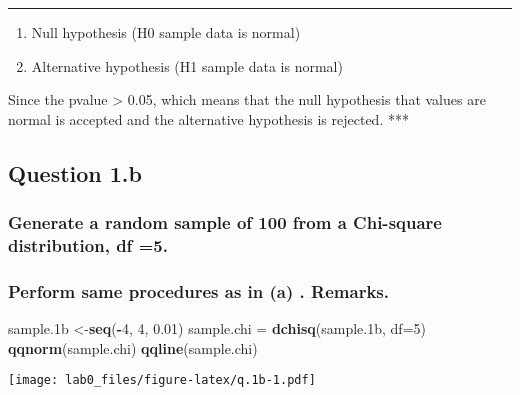 \documentclass[
]{article}
\newenvironment{Shaded}{\begin{snugshade}}{\end{snugshade}}
\newcommand{\DataTypeTok}[1]{\textcolor[rgb]{0.13,0.29,0.53}{#1}}
\newcommand{\DecValTok}[1]{\textcolor[rgb]{0.00,0.00,0.81}{#1}}
\newcommand{\FloatTok}[1]{\textcolor[rgb]{0.00,0.00,0.81}{#1}}
\newcommand{\KeywordTok}[1]{\textcolor[rgb]{0.13,0.29,0.53}{\textbf{#1}}}
\newcommand{\NormalTok}[1]{#1}
\newcommand{\OperatorTok}[1]{\textcolor[rgb]{0.81,0.36,0.00}{\textbf{#1}}}
\newcommand{\StringTok}[1]{\textcolor[rgb]{0.31,0.60,0.02}{#1}}
\providecommand{\tightlist}{%
  \setlength{\itemsep}{0pt}\setlength{\parskip}{0pt}}
\begin{document}
\begin{center}\rule{0.5\linewidth}{0.5pt}\end{center}

\begin{enumerate}
\def\labelenumi{\arabic{enumi}.}
\tightlist
\item
  Null hypothesis (H0 sample data is normal)
\item
  Alternative hypothesis (H1 sample data is normal)
\end{enumerate}

Since the pvalue \textgreater{} 0.05, which means that the null
hypothesis that values are normal is accepted and the alternative
hypothesis is rejected. ***

\hypertarget{question-1.b}{%
\subsection{Question 1.b}\label{question-1.b}}

\hypertarget{generate-a-random-sample-of-100-from-a-chi-square-distribution-df-5.}{%
\subsubsection{Generate a random sample of 100 from a Chi-square
distribution, df
=5.}\label{generate-a-random-sample-of-100-from-a-chi-square-distribution-df-5.}}

\hypertarget{perform-same-procedures-as-in-a-.-remarks.}{%
\subsubsection{Perform same procedures as in (a) .
Remarks.}\label{perform-same-procedures-as-in-a-.-remarks.}}

\begin{Shaded}
\begin{Highlighting}[]
\NormalTok{sample}\FloatTok{.1}\NormalTok{b <-}\KeywordTok{seq}\NormalTok{(}\OperatorTok{-}\DecValTok{4}\NormalTok{, }\DecValTok{4}\NormalTok{, }\FloatTok{0.01}\NormalTok{)}
\NormalTok{sample.chi =}\StringTok{ }\KeywordTok{dchisq}\NormalTok{(sample}\FloatTok{.1}\NormalTok{b, }\DataTypeTok{df=}\DecValTok{5}\NormalTok{)}
\KeywordTok{qqnorm}\NormalTok{(sample.chi)}
\KeywordTok{qqline}\NormalTok{(sample.chi)}
\end{Highlighting}
\end{Shaded}

\texttt{[image: lab0\_files/figure-latex/q.1b-1.pdf]}
\end{document}
